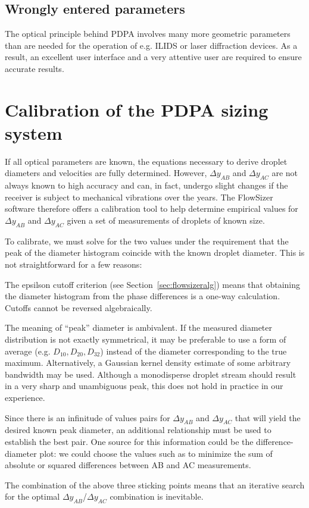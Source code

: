 \documentclass[11.5pt,oneside]{book}
\newcommand*{\secref}[1]{Section~\ref{#1}}
\begin{document}
\subsection{Wrongly entered parameters}
The optical principle behind PDPA involves many more geometric parameters than are needed
for the operation of e.g. ILIDS or laser diffraction devices. As a result, an
excellent user interface and a very attentive user are required to ensure accurate
results.

\section{Calibration of the PDPA sizing system\label{sec:pdpa-calibration}}
If all optical parameters are known, the equations necessary to derive droplet
diameters and velocities are fully determined. However, $\Delta y_{AB}$ and
$\Delta y_{AC}$ are not always known to high accuracy and can, in fact, undergo
slight changes if the receiver is subject to mechanical vibrations over the
years. The FlowSizer software therefore offers a calibration tool to help
determine empirical values for $\Delta y_{AB}$ and $\Delta y_{AC}$ given a set
of measurements of droplets of known size.

To calibrate, we must solve for the two values under the
requirement that the peak of the diameter histogram coincide with the known
droplet diameter. This is not straightforward for a few reasons:
\begin{alist}
\item The epsilson cutoff criterion (see \secref{sec:flowsizeralg}) means that obtaining the diameter histogram from
        the phase differences is a one-way calculation. Cutoffs cannot be
        reversed algebraically.
      \item The meaning of ``peak'' diameter is ambivalent. If the measured diameter
        distribution is not exactly symmetrical, it may be preferable to use a
        form of average (e.g. $D_{10}, D_{20}, D_{32}$) instead of the diameter
        corresponding to the true maximum. Alternatively, a Gaussian kernel
        density estimate of some arbitrary bandwidth may be used. Although a
        monodisperse droplet stream should result in a very sharp and
        unambiguous peak, this does not hold in practice in our experience.
\item Since there is an infinitude of values pairs for $\Delta y_{AB}$ and $\Delta
        y_{AC}$ that will yield the desired known peak diameter, an additional
        relationship must be used to establish the best pair. One source for
        this information could be the difference-diameter plot: we could choose
        the values such as to minimize the sum
        of absolute or squared differences between AB and AC measurements.
\end{alist}
The combination of the above three sticking points means that an iterative search for the
optimal $\Delta y_{AB}$/$\Delta y_{AC}$ combination is inevitable.
\end{document}
